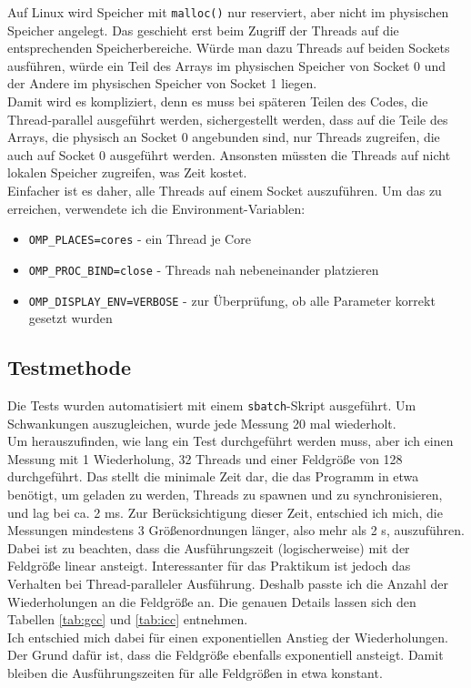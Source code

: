 \documentclass[german,plainarticle,hyperref,utf8]{zihpub}
\begin{document}
	Auf Linux wird Speicher mit \texttt{malloc()} nur reserviert, aber nicht im physischen Speicher angelegt. Das geschieht erst beim Zugriff der Threads auf die entsprechenden Speicherbereiche. Würde man dazu Threads auf beiden Sockets ausführen, würde ein Teil des Arrays im physischen Speicher von Socket 0 und der Andere im physischen Speicher von Socket 1 liegen.\\
	Damit wird es kompliziert, denn es muss bei späteren Teilen des Codes, die Thread-parallel ausgeführt werden, sichergestellt werden, dass auf die Teile des Arrays, die physisch an Socket 0 angebunden sind, nur Threads zugreifen, die auch auf Socket 0 ausgeführt werden. Ansonsten müssten die Threads auf nicht lokalen Speicher zugreifen, was Zeit kostet.\\
	Einfacher ist es daher, alle Threads auf einem Socket auszuführen. Um das zu erreichen, verwendete ich die Environment-Variablen:
	\begin{itemize}
		\item \texttt{OMP\_PLACES=cores} - ein Thread je Core
		\item \texttt{OMP\_PROC\_BIND=close} - Threads nah nebeneinander platzieren
		\item \texttt{OMP\_DISPLAY\_ENV=VERBOSE} - zur Überprüfung, ob alle Parameter korrekt gesetzt wurden
	\end{itemize}	
	\subsection{Testmethode}
	Die Tests wurden automatisiert mit einem \texttt{sbatch}-Skript ausgeführt. Um Schwankungen auszugleichen, wurde jede Messung 20 mal wiederholt.\\
	Um herauszufinden, wie lang ein Test durchgeführt werden muss, aber ich einen Messung mit 1 Wiederholung, 32 Threads und einer Feldgröße von 128 durchgeführt. Das stellt die minimale Zeit dar, die das Programm in etwa benötigt, um geladen zu werden, Threads zu spawnen und zu synchronisieren, und lag bei ca. 2 ms. Zur Berücksichtigung dieser Zeit, entschied ich mich, die Messungen mindestens 3 Größenordnungen länger, also mehr als 2 s, auszuführen.\\
	Dabei ist zu beachten, dass die Ausführungszeit (logischerweise) mit der Feldgröße linear ansteigt. Interessanter für das Praktikum ist jedoch das Verhalten bei Thread-paralleler Ausführung. Deshalb passte ich die Anzahl der Wiederholungen an die Feldgröße an. Die genauen Details lassen sich den Tabellen \ref{tab:gcc} und
	\ref{tab:icc} entnehmen.\\
	Ich entschied mich dabei für einen exponentiellen Anstieg der Wiederholungen. Der Grund dafür ist, dass die Feldgröße ebenfalls exponentiell ansteigt. Damit bleiben die Ausführungszeiten für alle Feldgrößen in etwa konstant.
	\newpage
\end{document}
